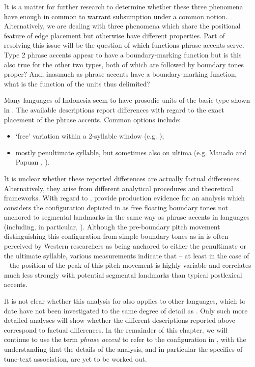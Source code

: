 \documentclass[output=paper
,modfonts
,nonflat]{langsci/langscibook}
\begin{document}
\noindent
It is a matter for further research to determine whether these three phenomena have enough in common to warrant subsumption under a common notion. Alternatively, we are dealing with three phenomena which share the positional feature of edge placement but otherwise have different properties. Part of resolving this issue will be the question of which functions phrase accents serve. Type 2 phrase accents appear to have a boundary-marking function but is this also true for the other two types, both of which are followed by boundary tones proper? And, inasmuch as phrase accents have a boundary-marking function, what is the function of the units thus delimited?

Many  languages of Indonesia seem to have prosodic units of the basic type shown in . The available descriptions report differences with regard to the exact placement of the phrase accents. Common options include:

\begin{itemize}
	\item ‘free’ variation within a 2-syllable window (e.g. );
	\item mostly penultimate syllable, but sometimes also on ultima (e.g. Manado and Papuan , ).
\end{itemize}

\noindent
It is unclear whether these reported differences are actually factual differences. Alternatively, they arise from different analytical procedures and theoretical frameworks. With regard to  , \citet{Maskikit-Essed2016} provide production evidence for an analysis which considers the configuration depicted in  as free floating boundary tones not anchored to segmental landmarks in the same way as phrase accents in  languages (including, in particular, ). Although the pre-boundary pitch movement distinguishing this configuration from simple boundary tones as in  is often perceived by Western researchers as being anchored to either the penultimate or the ultimate syllable, various measurements indicate that – at least in the case of   – the position of the peak of this pitch movement is highly variable and correlates much less strongly with potential segmental landmarks than typical  postlexical accents. 

It is not clear whether this analysis for   also applies to other languages, which to date have not been investigated to the same degree of detail as  . Only such more detailed analyses will show whether the different descriptions reported above correspond to factual differences. In the remainder of this chapter, we will continue to use the term \textit{phrase accent} to refer to the configuration in , with the understanding that the details of the analysis, and in particular the specifics of tune-text association, are yet to be worked out.
\end{document}
